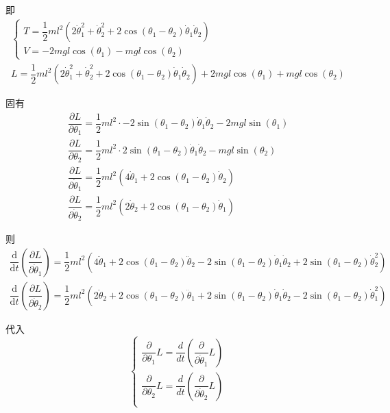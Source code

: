 \documentclass[UTF8]{ctexart}
\newcommand{\rmd}{\mathrm{d}}
\begin{document}
			即
			\begin{gather}
				\begin{cases}
					T = \dfrac{1}{2} m l^2 \left(2 \dot{\theta}_{1}^{2} + \dot{\theta}_{2}^{2} + 2 \cos(\theta_{1} - \theta_{2}) \dot{\theta}_{1} \dot{\theta}_{2}\right) \\
					V = -2 m g l \cos(\theta_1) - m g l \cos(\theta_2)
				\end{cases}
				\\
				L = \dfrac{1}{2} m l^2 \left(2 \dot{\theta}_{1}^{2} + \dot{\theta}_{2}^{2} + 2 \cos(\theta_{1} - \theta_{2}) \dot{\theta}_{1} \dot{\theta}_{2}\right) + 2 m g l \cos(\theta_1) + m g l \cos(\theta_2)
			\end{gather}

			固有
			\begin{gather}
				\dfrac{\partial L}{\partial \theta_{1}} = \dfrac{1}{2} m l^2 \cdot -2 \sin(\theta_{1} - \theta_{2}) \dot{\theta}_{1} \dot{\theta}_{2} - 2 m g l \sin(\theta_1)    \\
				\dfrac{\partial L}{\partial \theta_{2}} = \dfrac{1}{2} m l^2 \cdot  2 \sin(\theta_{1} - \theta_{2}) \dot{\theta}_{1} \dot{\theta}_{2} -   m g l \sin(\theta_2)    \\
				\dfrac{\partial L}{\partial \dot{\theta}_{1}} = \dfrac{1}{2} m l^2 \left(4 \dot{\theta}_{1} + 2 \cos(\theta_{1} - \theta_{2}) \dot{\theta}_{2}\right)           \\
				\dfrac{\partial L}{\partial \dot{\theta}_{2}} = \dfrac{1}{2} m l^2 \left(2 \dot{\theta}_{2} + 2 \cos(\theta_{1} - \theta_{2}) \dot{\theta}_{1}\right)
			\end{gather}

			则
			\begin{gather}
				\dfrac{\rmd}{\rmd t} \left(\dfrac{\partial L}{\partial \dot{\theta}_{1}}\right) = \dfrac{1}{2} m l^2 \left(4 \ddot{\theta}_{1} + 2 \cos(\theta_{1} - \theta_{2}) \ddot{\theta}_{2} - 2 \sin(\theta_{1} - \theta_{2}) \dot{\theta}_{1} \dot{\theta}_{2} + 2 \sin(\theta_{1} - \theta_{2}) \dot{\theta}_{2}^{2}\right)           \\
				\dfrac{\rmd}{\rmd t} \left(\dfrac{\partial L}{\partial \dot{\theta}_{2}}\right) = \dfrac{1}{2} m l^2 \left(2 \ddot{\theta}_{2} + 2 \cos(\theta_{1} - \theta_{2}) \ddot{\theta}_{1} + 2 \sin(\theta_{1} - \theta_{2}) \dot{\theta}_{1} \dot{\theta}_{2} - 2 \sin(\theta_{1} - \theta_{2}) \dot{\theta}_{1}^{2}\right)
			\end{gather}

			代入
			\begin{equation}
				\begin{cases}
					\dfrac{\partial}{\partial \theta_{1}}L = \dfrac{d}{dt}\left(\dfrac{\partial}{\partial \dot{\theta}_{1}}L\right)    \\
					\dfrac{\partial}{\partial \theta_{2}}L = \dfrac{d}{dt}\left(\dfrac{\partial}{\partial \dot{\theta}_{2}}L\right)    \\
				\end{cases}
			\end{equation}
\end{document}
